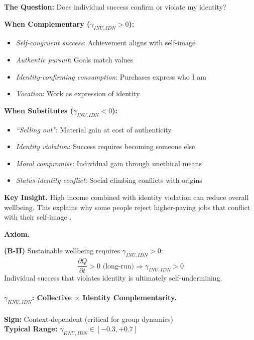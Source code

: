\textbf{The Question:} Does individual success confirm or violate my identity?

\textbf{When Complementary ($\gamma_{INU,IDN} > 0$):}
\begin{itemize}
    \item \textit{Self-congruent success}: Achievement aligns with self-image
    \item \textit{Authentic pursuit}: Goals match values
    \item \textit{Identity-confirming consumption}: Purchases express who I am
    \item \textit{Vocation}: Work as expression of identity
\end{itemize}

\textbf{When Substitutes ($\gamma_{INU,IDN} < 0$):}
\begin{itemize}
    \item \textit{``Selling out''}: Material gain at cost of authenticity
    \item \textit{Identity violation}: Success requires becoming someone else
    \item \textit{Moral compromise}: Individual gain through unethical means
    \item \textit{Status-identity conflict}: Social climbing conflicts with origins
\end{itemize}

\textbf{Key Insight.}
High income combined with identity violation can reduce overall wellbeing.
This explains why some people reject higher-paying jobs that conflict with 
their self-image \citep{akerlofkranton}.

\textbf{Axiom.}
\begin{axiom}
\label{ax:B-II}
\textbf{(B-II)} Sustainable wellbeing requires $\gamma_{INU,IDN} > 0$:
\begin{equation}
    \frac{\partial Q}{\partial t} > 0 \text{ (long-run)} \Rightarrow \gamma_{INU,IDN} > 0
\end{equation}
Individual success that violates identity is ultimately self-undermining.
\end{axiom}


\paragraph{$\gamma_{KNU,IDN}$: Collective $\times$ Identity Complementarity.}

\begin{tcolorbox}[colback=yellow!5, colframe=yellow!50!black]
\textbf{Sign:} Context-dependent (critical for group dynamics) \\
\textbf{Typical Range:} $\gamma_{KNU,IDN} \in [-0.3, +0.7]$
\end{tcolorbox}

